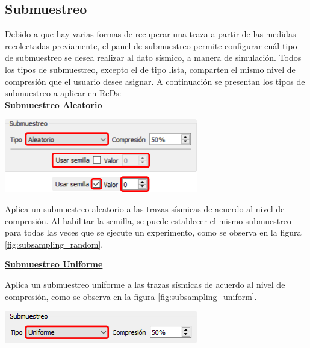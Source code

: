 \documentclass[12pt,twoside,letter]{ol-softwaremanual}
\newcommand*\circled[1]{\tikz[baseline=(char.base)]{
            \node[shape=circle,draw,inner sep=2pt] (char) {#1};}}
\newenvironment{Figure}
  {\par\medskip\noindent\minipage{\linewidth}}
  {\endminipage\par\medskip}
\begin{document}
\subsection{Submuestreo}\label{subsampling}

Debido a que hay varias formas de recuperar una traza a partir de las medidas recolectadas previamente, el panel de submuestreo \circled{4} permite configurar cuál tipo de submuestreo se desea realizar al dato sísmico, a manera de simulación. Todos los tipos de submuestreo, excepto el de tipo lista, comparten el mismo nivel de compresión que el usuario desee asignar. A continuación se presentan los tipos de submuestreo a aplicar en ReDs:\\

\underline{\textbf{Submuestreo Aleatorio}}

\begin{multicols}{2}
\begin{Figure}
	\centering
	\includegraphics[width=0.8\linewidth]{subsampling-random.png}
	\label{fig:subsampling_random}
\end{Figure}

Aplica un submuestreo aleatorio a las trazas sísmicas de acuerdo al nivel de compresión. Al habilitar la semilla, se puede establecer el mismo submuestreo para todas las veces que se ejecute un experimento, como se observa en la figura \ref{fig:subsampling_random}.

\end{multicols}

\underline{\textbf{Submuestreo Uniforme}}

\begin{multicols}{2}

Aplica un submuestreo uniforme a las trazas sísmicas de acuerdo al nivel de compresión, como se observa en la figura \ref{fig:subsampling_uniform}.

\begin{Figure}
    \centering
    \includegraphics[width=0.8\linewidth]{subsampling-uniform.png}
    \label{fig:subsampling_uniform}
\end{Figure}

\end{multicols}
\end{document}
